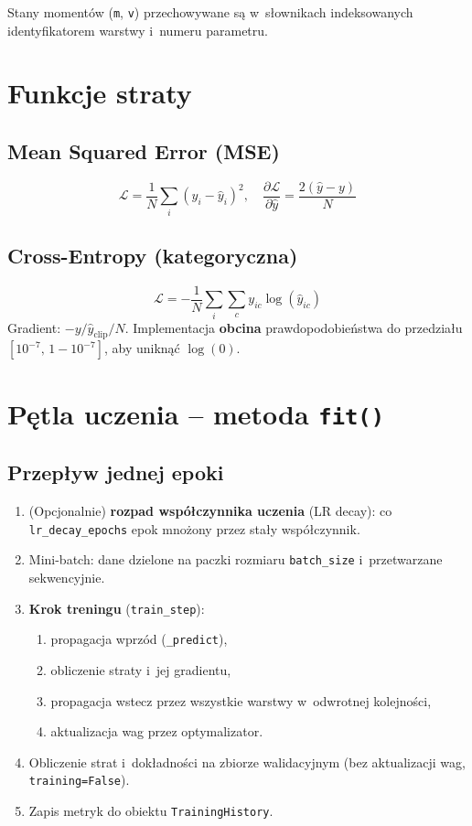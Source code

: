\documentclass[12pt,a4paper]{article}
\begin{document}
Stany momentów (\texttt{m}, \texttt{v}) przechowywane są w~słownikach indeksowanych identyfikatorem warstwy i~numeru parametru.

\section{Funkcje straty}

\subsection{Mean Squared Error (MSE)}
\[
  \mathcal{L} = \frac{1}{N}\sum_i (y_i - \hat{y}_i)^2, \quad
  \frac{\partial \mathcal{L}}{\partial \hat{y}} = \frac{2(\hat{y} - y)}{N}
\]

\subsection{Cross-Entropy (kategoryczna)}
\[
  \mathcal{L} = -\frac{1}{N}\sum_i \sum_c y_{ic}\log(\hat{y}_{ic})
\]
Gradient: $-y/\hat{y}_{\text{clip}}/N$.
Implementacja \textbf{obcina} prawdopodobieństwa do przedziału $[10^{-7},\,1-10^{-7}]$, aby uniknąć $\log(0)$.

\section{Pętla uczenia -- metoda \texttt{fit()}}

\subsection{Przepływ jednej epoki}

\begin{enumerate}
  \item (Opcjonalnie) \textbf{rozpad współczynnika uczenia} (LR decay): co \texttt{lr\_decay\_epochs} epok mnożony przez stały współczynnik.
  \item Mini-batch: dane dzielone na paczki rozmiaru \texttt{batch\_size} i~przetwarzane sekwencyjnie.
  \item \textbf{Krok treningu} (\texttt{train\_step}):
    \begin{enumerate}[label=\alph*)]
      \item propagacja wprzód (\texttt{\_predict}),
      \item obliczenie straty i~jej gradientu,
      \item propagacja wstecz przez wszystkie warstwy w~odwrotnej kolejności,
      \item aktualizacja wag przez optymalizator.
    \end{enumerate}
  \item Obliczenie strat i~dokładności na zbiorze walidacyjnym (bez aktualizacji wag, \texttt{training=False}).
  \item Zapis metryk do obiektu \texttt{TrainingHistory}.
\end{enumerate}
\end{document}
